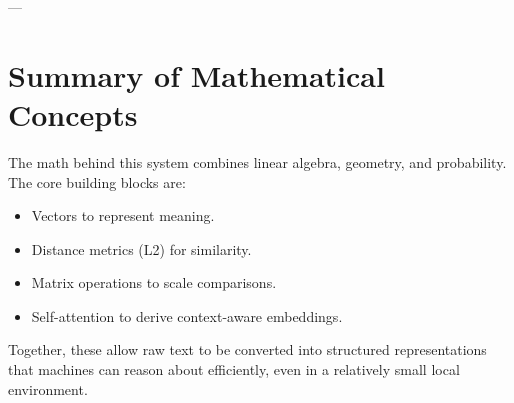 ---

\section{Summary of Mathematical Concepts}
\label{sec:math-summary}

The math behind this system combines linear algebra, geometry, and probability. The core building blocks are:

\begin{itemize}
    \item Vectors to represent meaning.
    \item Distance metrics (L2) for similarity.
    \item Matrix operations to scale comparisons.
    \item Self-attention to derive context-aware embeddings.
\end{itemize}

Together, these allow raw text to be converted into structured representations that machines can reason about efficiently, even in a relatively small local environment.
